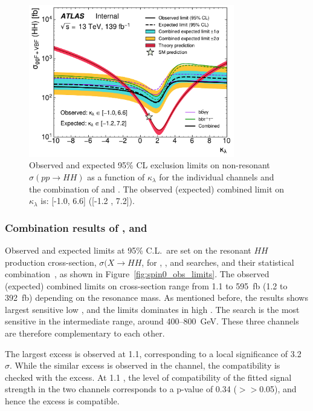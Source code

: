 \begin{figure}[htbp]
\centering
\includegraphics[width=0.8\textwidth]{DiHiggs/plots/kl_scan/20210926/all_channels_kl_scan_mH125.pdf}
\caption{Observed and expected 95\% CL exclusion limits on non-resonant $\sigma(pp \rightarrow HH)$ as a function of $\kappa_\lambda$ for the individual channels and the combination of \bbtt and \bbyy.
The observed (expected) combined limit on $\kappa_\lambda$ is:  [-1.0, 6.6]  ([-1.2 , 7.2]).
}
\label{fig:kl_scan_combined}
\end{figure}



\subsubsection{Combination results of \bbtt, \bbyy and \bbbb}

Observed and expected limits at 95\% C.L.\  are set on the resonant $HH$ production cross-section, 
$\sigma(X \rightarrow HH$, for \bbyy, \bbtt, and \bbbb searches, and their statistical combination~\cite{ATLAS-CONF-2021-052},
as shown in 
Figure~\ref{fig:spin0_obs_limits}.
The observed (expected) combined limits on cross-section range from 1.1 to 595~fb (1.2 to 392~fb) depending 
on the resonance mass.
As mentioned before, the \bbyy results shows largest sensitive low \mX, and the \bbbb limits dominates in high \mX.
The \bbtt search is the most sensitive in the intermediate range, around 400--800~GeV.
These three channels are therefore complementary to each other. 

The largest excess is observed at \SI{1.1}{\tev}, corresponding to a local significance of
3.2~$\sigma$. While the similar excess is observed in the \bbtt channel, the compatibility 
is checked with the \bbbb excess. At 1.1 \tev, the level of compatibility
of the fitted signal strength in the two channels corresponds to a p-value
of 0.34 ($>>$0.05), and hence the excess is compatible.


